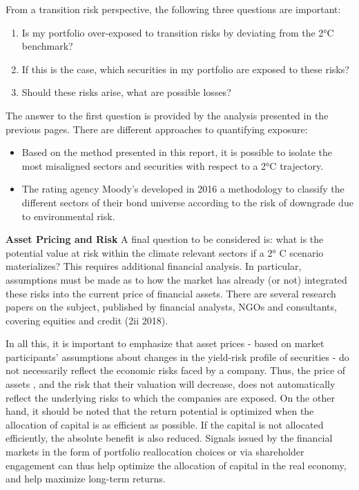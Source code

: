 \documentclass[10pt,table,a4]{article}\usepackage[]{graphicx}\usepackage[]{color}
\begin{document}
\begin{multicols}{2}
			From a transition risk perspective, the following three questions are important:
			
			\begin{enumerate}
				\item{Is my portfolio over-exposed to transition risks by deviating from the 2°C benchmark?}
				\item{If this is the case, which securities in my portfolio are exposed to these risks?}
				\item{Should these risks arise, what are possible losses?}
			\end{enumerate}
			
			
			The answer to the first question is provided by the analysis presented in the previous pages. There are different approaches to quantifying exposure:
			
			\begin{itemize}
				\item{Based on the method presented in this report, it is possible to isolate the most misaligned sectors and securities with respect to a 2°C trajectory.}
				
				\item{The rating agency Moody’s developed in 2016 a methodology to classify the different sectors of their bond universe according to the risk of downgrade due to environmental risk.}
			\end{itemize}
			
			
			\textbf{Asset Pricing and Risk} 
			A final question to be considered is: what is the potential value at risk within the climate relevant sectors if a 2° C scenario materializes? This requires additional financial analysis. In particular, assumptions must be made as to how the market has already (or not) integrated these risks into the current price of financial assets. There are several research papers on the subject, published by financial analysts, NGOs and consultants, covering equities and credit (2ii 2018). 
			
			In all this, it is important to emphasize that asset prices - based on market participants’ assumptions about changes in the yield-risk profile of securities - do not necessarily reflect the economic risks faced by a company. Thus, the price of assets , and the risk that their valuation will decrease, does not automatically reflect the underlying risks to which the companies are exposed. On the other hand, it should be noted that the return potential is optimized when the allocation of capital is as efficient as possible. If the capital is not allocated efficiently, the absolute benefit is also reduced. Signals issued by the financial markets in the form of portfolio reallocation choices or via shareholder engagement can thus help optimize the allocation of capital in the real economy, and help maximize long-term returns.
		\end{multicols}
	
\end{document}

